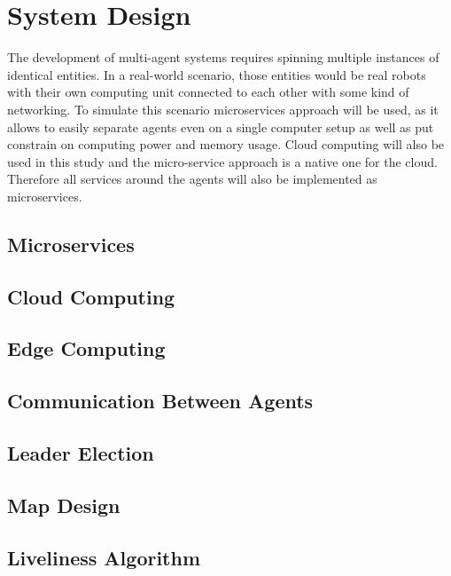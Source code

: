 \chapter{System Design}
The development of multi-agent systems requires spinning multiple instances of identical entities. In a real-world scenario, those entities would be real robots with their own computing unit connected to each other with some kind of networking. To simulate this scenario microservices approach will be used, as it allows to easily separate agents even on a single computer setup as well as put constrain on computing power and memory usage.
Cloud computing will also be used in this study and the micro-service approach is a native one for the cloud. Therefore all services around the agents will also be implemented as microservices.
\section{Microservices}


\section{Cloud Computing}


\section{Edge Computing}


\section{Communication Between Agents}


\section{Leader Election}


\section{Map Design}


\section{Liveliness Algorithm}
